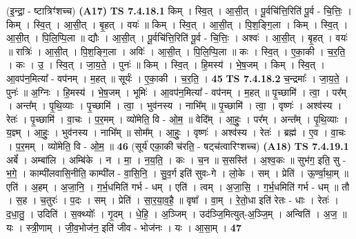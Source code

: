 \documentclass[17pt]{extarticle}
\begin{document}
                  \newline
                      (इ॒न्द्रा॒ - ष्टात्रिꣳ॑शच्च)  \textbf{(A17)} \newline \newline
                                \textbf{ TS 7.4.18.1} \newline
                  किम् । स्वि॒त् । आ॒सी॒त् । पू॒र्वचि॑त्ति॒रिति॑ पू॒र्व - चि॒त्तिः॒ । किम् । स्वि॒त् । आ॒सी॒त् । बृ॒हत् । वयः॑ ॥ किम् । स्वि॒त् । आ॒सी॒त् । पि॒श॒ङ्गि॒ला । किम् । स्वि॒त् । आ॒सी॒त् । पि॒लि॒प्पि॒ला ॥ द्यौः । आ॒सी॒त् । पू॒र्वचि॑त्ति॒रिति॑ पू॒र्व - चि॒त्तिः॒ । अश्वः॑ । आ॒सी॒त् । बृ॒हत् । वयः॑ ॥ रात्रिः॑ । आ॒सी॒त् । पि॒श॒ङ्गि॒ला । अविः॑ । आ॒सी॒त् । पि॒लि॒प्पि॒ला ॥ कः । स्वि॒त् । ए॒का॒की । च॒र॒ति॒ । कः । उ॒ । स्वि॒त् । जा॒य॒ते॒ । पुनः॑ ॥ किम् । स्वि॒त् । हि॒मस्य॑ । भे॒ष॒जम् । किम् । स्वि॒त् । आ॒वप॑न॒मित्या᳚ - वप॑नम् । म॒हत् ॥ सूर्यः॑ । ए॒का॒की । च॒र॒ति॒ । \textbf{  45} \newline
                  \newline
                                \textbf{ TS 7.4.18.2} \newline
                  च॒न्द्रमाः᳚ । जा॒य॒ते॒ । पुनः॑ ॥ अ॒ग्निः । हि॒मस्य॑ । भे॒ष॒जम् । भूमिः॑ । आ॒वप॑न॒मित्या᳚ - वप॑नम् । म॒हत् ॥ पृ॒च्छामि॑ । त्वा॒ । पर᳚म् । अन्त᳚म् । पृ॒थि॒व्याः । पृ॒च्छामि॑ । त्वा॒ । भुव॑नस्य । नाभि᳚म् ॥ पृ॒च्छामि॑ । त्वा॒ । वृष्णः॑ । अश्व॑स्य । रेतः॑ । पृ॒च्छामि॑ । वा॒चः । प॒र॒मम् । व्यो॑मेति॒ वि - ओ॒म॒ ॥ वेदि᳚म् । आ॒हुः॒ । पर᳚म् । अन्त᳚म् । पृ॒थि॒व्याः । य॒ज्ञ्म् । आ॒हुः॒ । भुव॑नस्य । नाभि᳚म् ॥ सोम᳚म् । आ॒हुः॒ । वृष्णः॑ । अश्व॑स्य । रेतः॑ । ब्रह्म॑ । ए॒व । वा॒चः । प॒र॒मम् । व्यो॑मेति॒ वि - ओ॒म॒ ॥ \textbf{  46} \newline
                  \newline
                      (सूर्य॑ एका॒की च॑रति॒ - षट्च॑त्वारिꣳशच्च)  \textbf{(A18)} \newline \newline
                                \textbf{ TS 7.4.19.1} \newline
                  अबें᳚ । अम्बा॑लि । अम्बि॑के । न । मा॒ । न॒य॒ति॒ । कः । च॒न ॥ स॒सस्ति॑ । अ॒श्व॒कः ॥ सुभ॑ग॒ इति॒ सु - भ॒गे॒ । काम्पी॑लवासि॒नीति॒ काम्पी॑ल - वा॒सि॒नि॒ । सु॒व॒र्ग इति॑ सुवः-गे । लो॒के । सम् । प्रेति॑ । ऊ॒र्ण्वा॒था॒म् ॥ एति॑ । अ॒हम् । अ॒जा॒नि॒ । ग॒र्भ॒धमिति॑ गर्भ - धम् । एति॑ । त्वम् । अ॒जा॒सि॒ । ग॒र्भ॒धमिति॑ गर्भ - धम् ॥ तौ । स॒ह । च॒तुरः॑ । प॒दः । सम् । प्रेति॑ । सा॒र॒या॒व॒है॒ ॥ वृषा᳚ । वा॒म् । रे॒तो॒धा इति॑ रेतः - धाः । रेतः॑ । द॒धा॒तु॒ । उदिति॑ । स॒क्थ्योः᳚ । गृ॒दम् । धे॒हि॒ । अ॒ञ्जिम् । उद॑ञ्जि॒मित्युत्-अ॒ञ्जि॒म् । अन्विति॑ । अ॒ज॒ ॥ यः । स्त्री॒णाम् । जी॒व॒भोज॑न॒ इति॑ जीव - भोज॑नः । यः । आ॒सा॒म् । \textbf{  47} \newline
\end{document}
